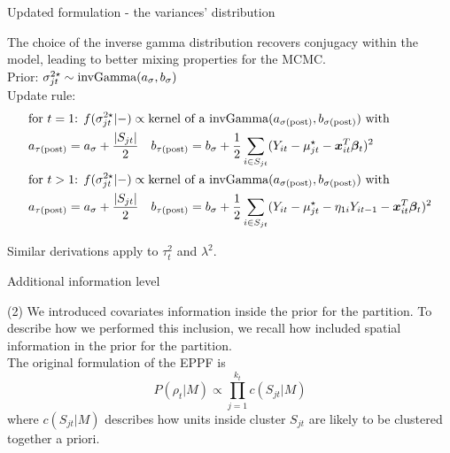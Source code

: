 \documentclass[
	11pt, %
 xcolor={dvipsnames,svgnames}
]{beamer}
\newcommand\numberthis{\addtocounter{equation}{1}\tag{\theequation}}
\begin{document}
\begin{frame}{Updated formulation - the variances' distribution}

The choice of the inverse gamma distribution \alert{recovers conjugacy within the model}, leading to better mixing properties for the MCMC.\\[6pt]
Prior: $\sigma_{jt}^{2\star} \sim \text{invGamma}(a_\sigma, b_\sigma)$\\
Update rule:
{\small
\begin{align*}
&\text{for $t=1$} \text{: }
  f(\sigma^{2\star}_{jt}|-)\propto \text{kernel of a $\invgamma(a_{\postp{\sigma}}, b_{\postp{\sigma}})$ with}\\
&a_{\postp{\tau}}= a_\sigma + \frac{|S_{jt}|}{2} \quad
%
b_{\postp{\tau}}=b_\sigma + \frac{1}{2}\sum_{i \in S_{jt}}(Y_{it}-\mu^\star_{jt}-\vec{x}_{it}^T\vec{\beta}_t)^2 \\
&\text{for $t>1$}\text{: }
  f(\sigma^{2\star}_{jt}|-) \propto \text{kernel of a $\invgamma(a_{\postp{\sigma}}, b_{\postp{\sigma}})$ with}\\
&a_{\postp{\tau}}= a_\sigma + \frac{|S_{jt}|}{2} \quad
%
b_{\postp{\tau}}=b_\sigma + \frac{1}{2}\sum_{i \in S_{jt}}(Y_{it}-\mu^\star_{jt}-\eta_{1i}Y_{it-1}-\vec{x}_{it}^T\vec{\beta}_t)^2 
\end{align*}
}

Similar derivations apply to $\tau_t^2$ and $\lambda^2$.
\end{frame}


\begin{frame}{Additional information level}
    
\alert{(2) We introduced covariates information inside the prior for the partition}.
To describe how we performed this inclusion, we recall how \citet{1-drpm} included spatial information in the prior for the partition.\\[6pt]
The original formulation of the EPPF is
\begin{equation*}
    P(\rho_t|M) \propto \prod_{j=1}^{k_t} c(S_{jt}|M)
\end{equation*}
where $c(S_{jt}|M)$ describes how units inside cluster $S_{jt}$ are likely to be clustered together a priori. 
\end{frame}
\end{document}
